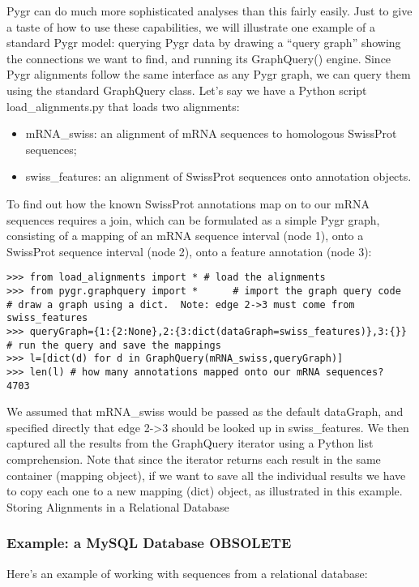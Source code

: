\documentclass{howto}
\begin{document}
Pygr can do much more sophisticated analyses than this fairly easily.  
Just to give a taste of how to use these capabilities, we will illustrate
one example of a standard Pygr model: querying Pygr data by drawing a ``query
graph'' showing the connections we want to find, and running its GraphQuery()
engine.  Since Pygr alignments follow the same interface as any Pygr graph, we can query them using the standard GraphQuery class.  Let's say we have a Python script load_alignments.py that loads two alignments:

\begin{itemize}

\item
mRNA_swiss: an alignment of mRNA sequences to homologous SwissProt sequences;

\item
swiss_features: an alignment of SwissProt sequences onto annotation objects. 

\end{itemize}
To find out how the known SwissProt annotations map on to our mRNA sequences requires a join, which can be formulated as a simple Pygr graph, consisting of a mapping of an mRNA sequence interval (node 1), onto a SwissProt sequence interval (node 2), onto a feature annotation (node 3):

\begin{verbatim}
>>> from load_alignments import * # load the alignments
>>> from pygr.graphquery import *      # import the graph query code
# draw a graph using a dict.  Note: edge 2->3 must come from swiss_features
>>> queryGraph={1:{2:None},2:{3:dict(dataGraph=swiss_features)},3:{}} 
# run the query and save the mappings
>>> l=[dict(d) for d in GraphQuery(mRNA_swiss,queryGraph)] 
>>> len(l) # how many annotations mapped onto our mRNA sequences?
4703
\end{verbatim}

We assumed that mRNA_swiss would be passed as the default dataGraph, and specified directly that edge 2->3 should be looked up in swiss_features.  We then captured all the results from the GraphQuery iterator using a Python list comprehension.  Note that since the iterator returns each result in the same container (mapping object), if we want to save all the individual results we have to copy each one to a new mapping (dict) object, as illustrated in this example.
Storing Alignments in a Relational Database


\subsubsection{Example: a MySQL Database OBSOLETE}
Here's an example of working with sequences from a relational database:
\end{document}

